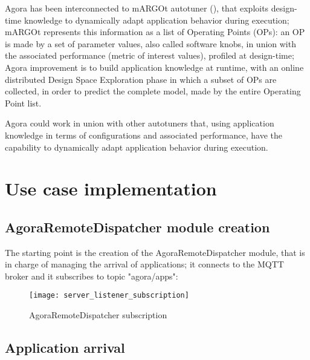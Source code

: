 Agora has been interconnected to mARGOt autotuner (\cite{gadioli2015application}), that exploits design-time knowledge to dynamically adapt application behavior during execution; mARGOt represents this information as a list of Operating Points (OPs): an OP is made by a set of parameter values, also called software knobs, in union with the associated performance (metric of interest values), profiled at design-time; Agora improvement is to build application knowledge at runtime, with an online distributed Design Space Exploration phase in which a subset of OPs are collected, in order to predict the complete model, made by the entire Operating Point list.

Agora could work in union with other autotuners that, using application knowledge in terms of configurations and associated performance, have the capability to dynamically adapt application behavior during execution.










\section{Use case implementation}





\subsection{AgoraRemoteDispatcher module creation}

The starting point is the creation of the AgoraRemoteDispatcher module, that is in charge of managing the arrival of applications; it connects to the MQTT broker and it subscribes to topic "agora/apps":

\begin{figure}[H]

    \centering
    \texttt{[image: server\_listener\_subscription]}
    \caption{AgoraRemoteDispatcher subscription}
    
\end{figure}





\subsection{Application arrival}

